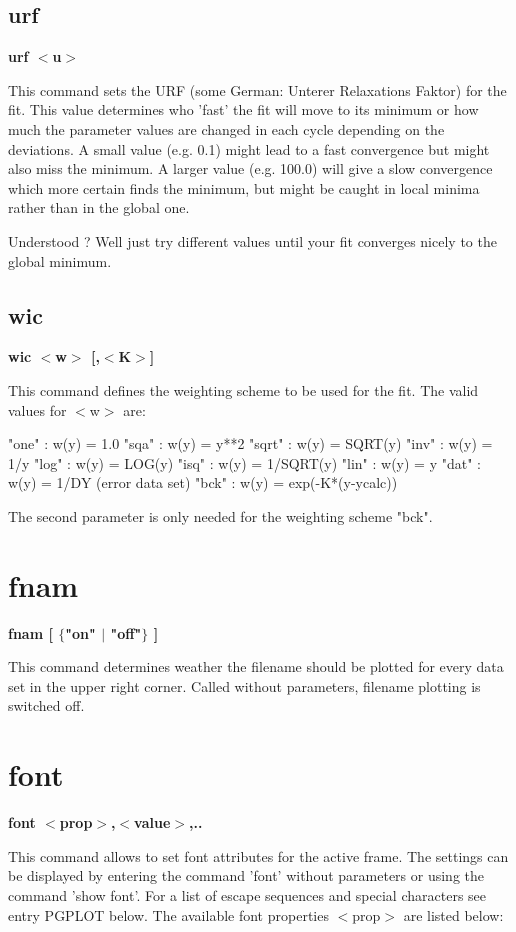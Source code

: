 \subsection*{urf}
{\bf urf $ <$u$> $ \par }
\par
\vspace{3pt}
This command sets the URF (some German: Unterer Relaxations Faktor) 
for the fit. This value determines who 'fast' the fit will move to 
its minimum or how much the parameter values are changed in each 
cycle depending on the deviations. A small value (e.g. 0.1) might 
lead to a fast convergence but might also miss the minimum. A larger 
value (e.g. 100.0) will give a slow convergence which more certain 
finds the minimum, but might be caught in local minima rather than in 
the global one. 
\par
Understood ? Well just try different values until your fit converges 
nicely to the global minimum. 
\subsection*{wic}
{\bf wic $ <$w$> $ [,$ <$K$> $] \par }
\par
\vspace{3pt}
This command defines the weighting scheme to be used for the fit. The 
valid values for $ <$w$> $ are: 
\par
\begin{MacVerbatim}
  "one"  : w(y) = 1.0              "sqa"  : w(y) = y**2
  "sqrt" : w(y) = SQRT(y)          "inv"  : w(y) = 1/y
  "log"  : w(y) = LOG(y)           "isq"  : w(y) = 1/SQRT(y)
  "lin"  : w(y) = y                "dat"  : w(y) = 1/DY (error data set)
  "bck"  : w(y) = exp(-K*(y-ycalc))
\end{MacVerbatim}
The second parameter is only needed for the weighting scheme "bck". 
\section{fnam}
{\bf fnam [ $ \{$"on" $| $ "off"$\} $ ] \par }
\par
\vspace{3pt}
This command determines weather the filename should be plotted for 
every data set in the upper right corner. Called without parameters, 
filename plotting is switched off. 
\section{font}
{\bf font $ <$prop$> $,$ <$value$> $,.. \par }
\par
\vspace{3pt}
This command allows to set font attributes for the active frame. 
The settings can be displayed by entering the command 'font' 
without parameters or using the command 'show font'. For a list 
of escape sequences and special characters see entry PGPLOT below. 
The available font properties $ <$prop$> $ are listed below: 
\par
